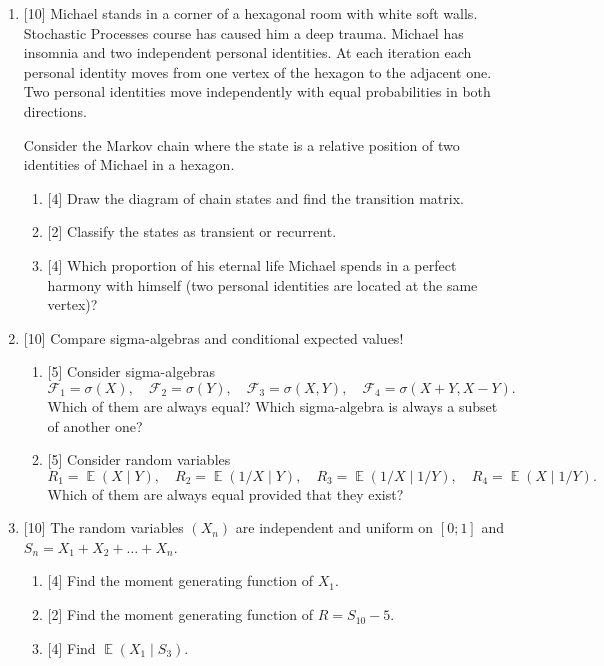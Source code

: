 \documentclass[12pt]{article}
\DeclareMathOperator{\E}{\mathbb{E}}
\newcommand{\cF}{\mathcal{F}}
\begin{document}
\begin{enumerate}
    \item {[10]} Michael stands in a corner of a hexagonal room with white soft walls. 
    Stochastic Processes course has caused him a deep trauma.
    Michael has insomnia and two independent personal identities.     
    At each iteration each personal identity moves from one vertex of the hexagon to the adjacent one.
    Two personal identities move independently with equal probabilities in both directions. 
    
    Consider the Markov chain where the state is a relative position of two identities of Michael in a hexagon. 
    \begin{enumerate}
        \item {[4]} Draw the diagram of chain states and find the transition matrix. 
        \item {[2]} Classify the states as transient or recurrent. 
        \item {[4]} Which proportion of his eternal life Michael spends in a perfect harmony with himself (two personal identities are located at the same vertex)?
    \end{enumerate}


    \item {[10]} Compare sigma-algebras and conditional expected values!
    
    \begin{enumerate}
        \item {[5]} Consider sigma-algebras 
        \[
        \cF_1 = \sigma(X), \quad \cF_2 = \sigma(Y), \quad \cF_3 = \sigma(X, Y), \quad \cF_4 = \sigma(X + Y, X - Y). %
        \]
        Which of them are always equal? Which sigma-algebra is always a subset of another one?

        \item {[5]} Consider random variables 
        \[
        R_1 = \E(X \mid Y), \quad R_2 = \E(1 / X \mid Y), \quad R_3 = \E(1 / X \mid 1/Y), \quad R_4 = \E(X \mid 1/Y). %
        \]
        Which of them are always equal provided that they exist?
    \end{enumerate}
    
    

    \item {[10]} The random variables $(X_n)$ are independent and uniform on $[0;1]$ and $S_n = X_1 + X_2 + \dots + X_n$.
    \begin{enumerate}
        \item {[4]} Find the moment generating function of $X_1$.
        \item {[2]} Find the moment generating function of $R = S_{10} - 5$.
        \item {[4]} Find $\E(X_1 \mid S_3)$.
    \end{enumerate}


\end{enumerate}
\end{document}
